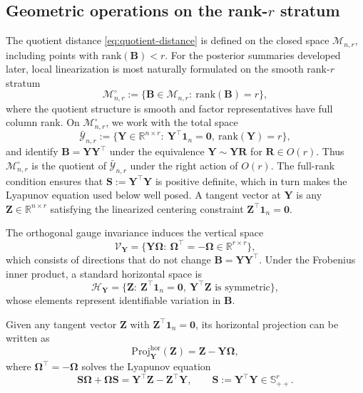 \documentclass[12pt]{article}
\newcommand{\calH}{\mathcal{H}}
\newcommand{\calV}{\mathcal{V}}
\newcommand{\calY}{\mathcal{Y}}
\newcommand{\calMnr}{\mathcal{M}_{n,r}}
\newcommand{\calMnro}{\mathcal{M}^{\circ}_{n,r}} %
\newcommand{\bbR}{\mathbb{R}}
\newcommand{\bbS}{\mathbb{S}}
\newcommand{\bfB}{\boldsymbol{B}}
\newcommand{\bfR}{\boldsymbol{R}}
\newcommand{\bfS}{\boldsymbol{S}}
\newcommand{\bfY}{\boldsymbol{Y}}
\newcommand{\bfZ}{\boldsymbol{Z}}
\newcommand{\bfOmega}{\boldsymbol{\Omega}}
\newcommand{\bfone}{\boldsymbol{1}}
\newcommand{\bfzero}{\boldsymbol{0}}
\begin{document}
\subsection{Geometric operations on the rank-$r$ stratum}\label{subsec:geomops}

The quotient distance \eqref{eq:quotient-distance} is defined on the closed space $\calMnr$,
including points with $\mathrm{rank}(\bfB)<r$. For the posterior summaries developed later, local
linearization is most naturally formulated on the smooth rank-$r$ stratum
\[
\calMnro := \{\bfB\in\calMnr:\ \mathrm{rank}(\bfB)=r\},
\]
where the quotient structure is smooth and factor representatives have full column rank. On $\calMnro$, we work with the total space
\[
\bar{\calY}_{n,r}
:=
\{\bfY\in\bbR^{n\times r}:\ \bfY^\top\bfone_n=\bfzero,\ \mathrm{rank}(\bfY)=r\},
\]
and identify $\bfB=\bfY\bfY^\top$ under the equivalence $\bfY\sim\bfY\bfR$ for $\bfR\in O(r)$.
Thus $\calMnro$ is the quotient of $\bar{\calY}_{n,r}$ under the right action of $O(r)$. The
full-rank condition ensures that $\bfS:=\bfY^\top\bfY$ is positive definite, which in turn makes
the Lyapunov equation used below well posed. A tangent vector at $\bfY$ is any
$\bfZ\in\bbR^{n\times r}$ satisfying the linearized centering constraint
$\bfZ^\top\bfone_n=\bfzero$.

The orthogonal gauge invariance induces the vertical space
\[
\calV_{\bfY}=\{\bfY\bfOmega:\ \bfOmega^\top=-\bfOmega\in\bbR^{r\times r}\},
\]
which consists of directions that do not change $\bfB=\bfY\bfY^\top$. Under the Frobenius inner
product, a standard horizontal space is
\[
\calH_{\bfY}
=
\{\bfZ:\ \bfZ^\top\bfone_n=\bfzero,\ \bfY^\top\bfZ \text{ is symmetric}\},
\]
whose elements represent identifiable variation in $\bfB$.

Given any tangent vector $\bfZ$ with $\bfZ^\top\bfone_n=\bfzero$, its horizontal projection can be
written as
\[
\mathrm{Proj}^{\mathrm{hor}}_{\bfY}(\bfZ)=\bfZ-\bfY\bfOmega,
\]
where $\bfOmega^\top=-\bfOmega$ solves the Lyapunov equation
\citep{simoncini_2016_ComputationalMethodsLinear}
\begin{equation}\label{eq:sylvester}
\bfS\bfOmega+\bfOmega\bfS = \bfY^\top\bfZ - \bfZ^\top\bfY,
\qquad \bfS:=\bfY^\top\bfY\in\bbS_{++}^r.
\end{equation}
\end{document}
